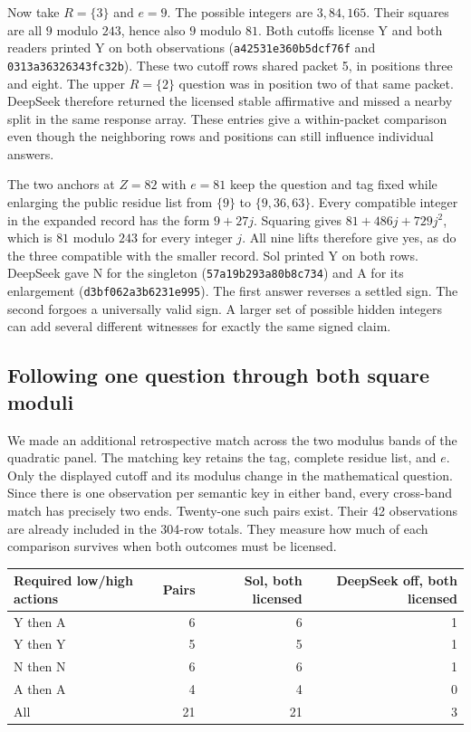 \documentclass[12pt,letterpaper]{article}
\begin{document}
Now take $R=\{3\}$ and $e=9$. The possible integers are $3,84,165$. Their squares are all $9$ modulo $243$, hence also $9$ modulo $81$. Both cutoffs license Y and both readers printed Y on both observations (\texttt{a42531e360b5dcf76f} and \texttt{0313a36326343fc32b}). These two cutoff rows shared packet 5, in positions three and eight. The upper $R=\{2\}$ question was in position two of that same packet. DeepSeek therefore returned the licensed stable affirmative and missed a nearby split in the same response array. These entries give a within-packet comparison even though the neighboring rows and positions can still influence individual answers.

The two anchors at $Z=82$ with $e=81$ keep the question and tag fixed while enlarging the public residue list from $\{9\}$ to $\{9,36,63\}$. Every compatible integer in the expanded record has the form $9+27j$. Squaring gives $81+486j+729j^2$, which is $81$ modulo $243$ for every integer $j$. All nine lifts therefore give yes, as do the three compatible with the smaller record. Sol printed Y on both rows. DeepSeek gave N for the singleton (\texttt{57a19b293a80b8c734}) and A for its enlargement (\texttt{d3bf062a3b6231e995}). The first answer reverses a settled sign. The second forgoes a universally valid sign. A larger set of possible hidden integers can add several different witnesses for exactly the same signed claim.

\subsection{Following one question through both square moduli}

We made an additional retrospective match across the two modulus bands of the quadratic panel. The matching key retains the tag, complete residue list, and $e$. Only the displayed cutoff and its modulus change in the mathematical question. Since there is one observation per semantic key in either band, every cross-band match has precisely two ends. Twenty-one such pairs exist. Their 42 observations are already included in the 304-row totals. They measure how much of each comparison survives when both outcomes must be licensed.

\begin{center}
\begin{tabular}{lrrr}
\toprule
Required low/high actions & Pairs & Sol, both licensed & DeepSeek off, both licensed\\
\midrule
Y then A & 6 & 6 & 1\\
Y then Y & 5 & 5 & 1\\
N then N & 6 & 6 & 1\\
A then A & 4 & 4 & 0\\
\midrule
All & 21 & 21 & 3\\
\bottomrule
\end{tabular}
\end{center}
\end{document}
